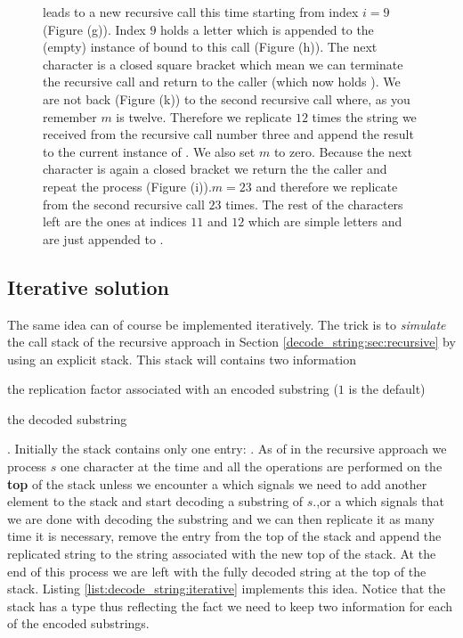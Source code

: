 \begin{figure}
{	leads to a new recursive call this time starting from index $i=9$ (Figure (g)). Index $9$ holds
	a letter which is appended to the (empty) instance of  bound to this call (Figure
	(h)). The next character is a closed square bracket which mean we can terminate the recursive
	call and return to the caller  (which now holds ). We are not back
	(Figure (k)) to the second recursive call where, as you remember $m$ is twelve. Therefore we
	replicate $12$ times the string we received from the recursive call number three and append the
	result to the current instance of . We also set $m$ to zero. Because the next
	character is again a closed bracket we return the the caller and repeat the process (Figure
	(i)).$m=23$ and therefore we replicate  from the second recursive call $23$ times.
	The rest of the characters left are the ones at indices $11$ and $12$ which are simple letters
	and are just appended to .}	
   \label{fig:decode_string:recursion}
 \end{figure}

 \subsection{Iterative solution}
 \label{decode_string:sec:iterative}
The same idea can of course be implemented iteratively. The trick is to \textit{simulate} the call
stack of the recursive approach in Section \ref{decode_string:sec:recursive} by using an explicit
stack. This stack will contains two information 
\begin{enumerate*}
	\item the replication factor associated with an encoded substring ($1$ is the default)
	\item the decoded substring \end{enumerate*}. Initially the stack contains only one entry: 
	. 
	As of in the recursive approach we process $s$ one character  at the time and all the
operations are performed on the \textbf{top} of the stack unless we encounter a \inline{'['} which
signals we need to add another element to the stack and start decoding a substring of $s$.,or a
\inline{']'} which signals that we are done with decoding the substring and we can then replicate it
as many time it is necessary, remove the entry from the top of the stack and append the replicated
string to the string associated with the new top of the stack. At the end of this process we are
left with the fully decoded string at the top of the stack. Listing
\ref{list:decode_string:iterative} implements this idea. Notice that the stack has a type
 thus reflecting the fact we need to keep two
information for each of the encoded substrings.
 

